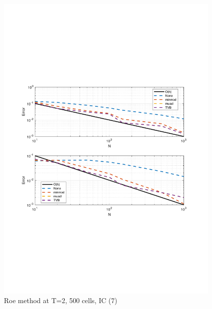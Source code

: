 \documentclass[11pt,a4paper]{article}
\begin{document}
\begin{figure}[!htb]
    \centering
    \includegraphics[width=11cm]{2_2_c_IC_3_Roe.pdf}
    \caption{Roe method at T=2, 500 cells, IC (7)}
    \label{fig:Roe_IC_3_error}
\end{figure}

\end{document}
